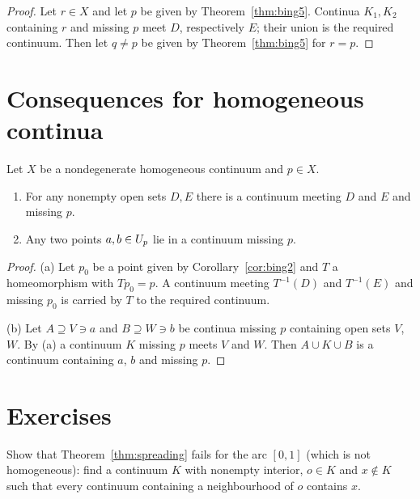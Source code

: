 \begin{proof}
Let $r\in X$ and let $p$ be given by Theorem~\ref{thm:bing5}. Continua $K_1,K_2$ containing $r$ and missing $p$ meet $D$,
respectively $E$; their union is the required continuum. Then let $q\ne p$ be given by Theorem~\ref{thm:bing5} for
$r=p$.
\end{proof}


\section{Consequences for homogeneous continua}

\begin{proposition}\label{prop:claim35}
Let $X$ be a nondegenerate homogeneous continuum and $p\in X$.
\begin{enumerate}[label=(\alph*)]
\item For any nonempty open sets $D,E$ there is a continuum meeting $D$ and $E$ and missing $p$.
\item Any two points $a,b\in U_{p}$ lie in a continuum missing $p$.
\end{enumerate}
\end{proposition}

\begin{proof}
(a) Let $p_0$ be a point given by Corollary~\ref{cor:bing2} and $T$ a homeomorphism with $Tp_0=p$. A continuum
meeting $T^{-1}(D)$ and $T^{-1}(E)$ and missing $p_0$ is carried by $T$ to the required continuum.

(b) Let $A\supseteq V\ni a$ and $B\supseteq W\ni b$ be continua missing $p$ containing open sets $V$, $W$. By (a) a continuum $K$
missing $p$ meets $V$ and $W$. Then $A\cup K\cup B$ is a continuum containing $a$, $b$ and missing $p$.
\end{proof}


\section*{Exercises}

\begin{exercise}
Show that Theorem~\ref{thm:spreading} fails for the arc $[0,1]$ (which is not homogeneous): find a continuum $K$ with
nonempty interior, $o\in K$ and $x\notin K$ such that every continuum containing a neighbourhood of $o$ contains $x$.
\end{exercise}

